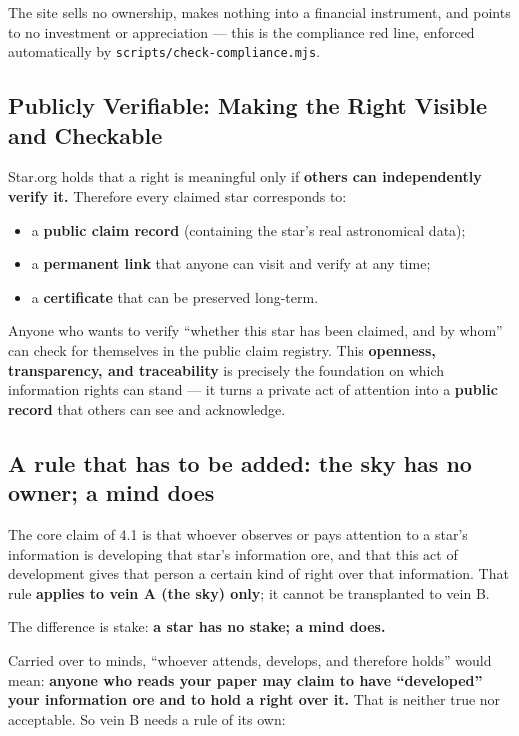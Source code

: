 \documentclass[11pt,fontset=none]{ctexart}
\begin{document}
The site sells no ownership, makes nothing into a financial instrument, and points to no investment or appreciation — this is the compliance red line, enforced automatically by \texttt{scripts/check-compliance.mjs}.

\subsection{Publicly Verifiable: Making the Right Visible and Checkable}

Star.org holds that a right is meaningful only if \textbf{others can independently verify it.} Therefore every claimed star corresponds to:

\begin{itemize}
  \item a \textbf{public claim record} (containing the star's real astronomical data);
  \item a \textbf{permanent link} that anyone can visit and verify at any time;
  \item a \textbf{certificate} that can be preserved long-term.
\end{itemize}

Anyone who wants to verify ``whether this star has been claimed, and by whom'' can check for themselves in the public claim registry. This \textbf{openness, transparency, and traceability} is precisely the foundation on which information rights can stand — it turns a private act of attention into a \textbf{public record} that others can see and acknowledge.

\subsection{A rule that has to be added: the sky has no owner; a mind does}

The core claim of 4.1 is that whoever observes or pays attention to a star's information is developing that star's information ore, and that this act of development gives that person a certain kind of right over that information. That rule \textbf{applies to vein A (the sky) only}; it cannot be transplanted to vein B.

The difference is stake: \textbf{a star has no stake; a mind does.}

Carried over to minds, ``whoever attends, develops, and therefore holds'' would mean: \textbf{anyone who reads your paper may claim to have ``developed'' your information ore and to hold a right over it.} That is neither true nor acceptable. So vein B needs a rule of its own:
\end{document}
